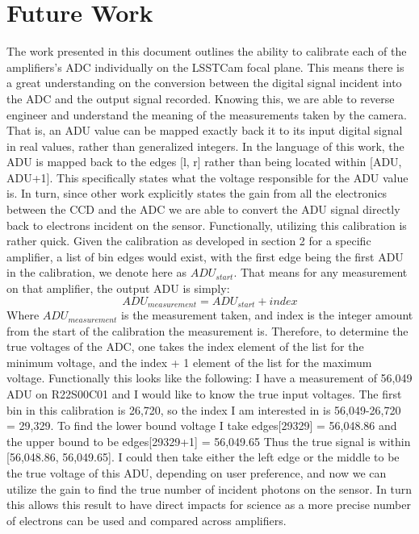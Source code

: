 \documentclass[11pt, letterpaper]{article}
\begin{document}
\section{Future Work}
\indent

The work presented in this document outlines the ability to calibrate each of the amplifiers's ADC individually on the LSSTCam focal plane. 
This means there is a great understanding on the conversion between the digital signal incident into the ADC and the output signal recorded. 
Knowing this, we are able to reverse engineer and understand the meaning of the measurements taken by the camera. 
That is, an ADU value can be mapped exactly back it to its input digital signal in real values, rather than generalized integers.
In the language of this work, the ADU is mapped back to the edges [l, r] rather than being located within [ADU, ADU+1].
This specifically states what the voltage responsible for the ADU value is. 
In turn, since other work explicitly states the gain from all the electronics between the CCD and the ADC we are able to convert the ADU signal directly back to electrons incident on the sensor.
Functionally, utilizing this calibration is rather quick. 
Given the calibration as developed in section 2 for a specific amplifier, a list of bin edges would exist, with the first edge being the first ADU in the calibration, we denote here as $ADU_{start}$.
That means for any measurement on that amplifier, the output ADU is simply:
 \begin{equation}\label{}
ADU_{measurement} = ADU_{start} + index 
\end{equation}
Where $ADU_{measurement}$ is the measurement taken, and index is the integer amount from the start of the calibration the measurement is. 
Therefore, to determine the true voltages of the ADC, one takes the index element of the list for the minimum voltage, and the index + 1 element of the list for the maximum voltage. 
Functionally this looks like the following: I have a measurement of 56,049 ADU on R22S00C01 and I would like to know the true input voltages. 
The first bin in this calibration is 26,720, so the index I am interested in is 56,049-26,720 = 29,329. 
To find the lower bound voltage I take edges[29329] = 56,048.86 and the upper bound to be edges[29329+1] = 56,049.65
Thus the true signal is within [56,048.86, 56,049.65]. 
I could then take either the left edge or the middle to be the true voltage of this ADU, depending on user preference, and now we can utilize the gain to find the true number of incident photons on the sensor. 
In turn this allows this result to have direct impacts for science as a more precise number of electrons can be used and compared across amplifiers. 
\end{document}
